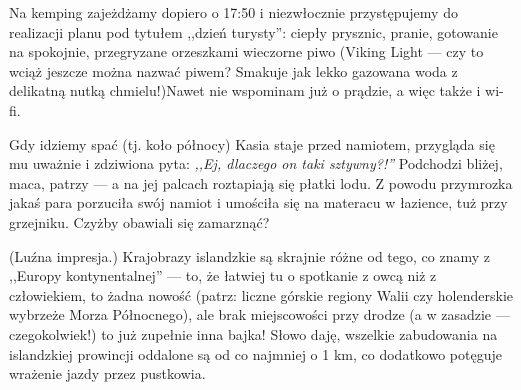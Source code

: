 

Na kemping zajeżdżamy dopiero o 17:50 i niezwłocznie przystępujemy do realizacji planu pod tytułem ,,dzień turysty'': ciepły prysznic, pranie, gotowanie na spokojnie, przegryzane orzeszkami wieczorne piwo (Viking Light --- czy to wciąż jeszcze można nazwać piwem? Smakuje jak lekko gazowana woda z delikatną nutką chmielu!)\textellipsis Nawet nie wspominam już o prądzie, a więc także i wi-fi.

Gdy idziemy spać (tj. koło północy) Kasia staje przed namiotem, przygląda się mu uważnie i zdziwiona pyta: \emph{,,Ej, dlaczego on taki sztywny?!''} Podchodzi bliżej, maca, patrzy --- a na jej palcach roztapiają się płatki lodu. Z powodu przymrozka jakaś para porzuciła swój namiot i umościła się na materacu w łazience, tuż przy grzejniku. Czyżby obawiali się zamarznąć?


(Luźna impresja.) Krajobrazy islandzkie są skrajnie różne od tego, co znamy z ,,Europy kontynentalnej'' --- to, że łatwiej tu o spotkanie z owcą niż z człowiekiem, to żadna nowość (patrz: liczne górskie regiony Walii czy holenderskie wybrzeże Morza Północnego), ale brak miejscowości przy drodze (a w zasadzie --- czegokolwiek!) to już zupełnie inna bajka! Słowo daję, wszelkie zabudowania na islandzkiej prowincji oddalone są od  co najmniej o 1 km, co dodatkowo potęguje wrażenie jazdy przez pustkowia.


